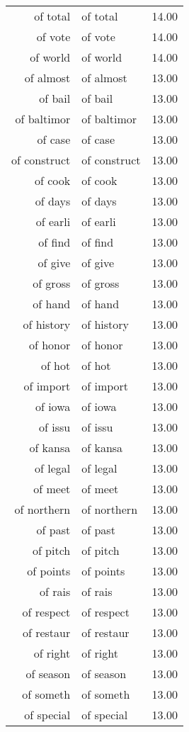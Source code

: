 \begin{table}[ht]
\begin{tabular}{rlr}
  of total & of total & 14.00 \\ 
  of vote & of vote & 14.00 \\ 
  of world & of world & 14.00 \\ 
  of almost & of almost & 13.00 \\ 
  of bail & of bail & 13.00 \\ 
  of baltimor & of baltimor & 13.00 \\ 
  of case & of case & 13.00 \\ 
  of construct & of construct & 13.00 \\ 
  of cook & of cook & 13.00 \\ 
  of days & of days & 13.00 \\ 
  of earli & of earli & 13.00 \\ 
  of find & of find & 13.00 \\ 
  of give & of give & 13.00 \\ 
  of gross & of gross & 13.00 \\ 
  of hand & of hand & 13.00 \\ 
  of history & of history & 13.00 \\ 
  of honor & of honor & 13.00 \\ 
  of hot & of hot & 13.00 \\ 
  of import & of import & 13.00 \\ 
  of iowa & of iowa & 13.00 \\ 
  of issu & of issu & 13.00 \\ 
  of kansa & of kansa & 13.00 \\ 
  of legal & of legal & 13.00 \\ 
  of meet & of meet & 13.00 \\ 
  of northern & of northern & 13.00 \\ 
  of past & of past & 13.00 \\ 
  of pitch & of pitch & 13.00 \\ 
  of points & of points & 13.00 \\ 
  of rais & of rais & 13.00 \\ 
  of respect & of respect & 13.00 \\ 
  of restaur & of restaur & 13.00 \\ 
  of right & of right & 13.00 \\ 
  of season & of season & 13.00 \\ 
  of someth & of someth & 13.00 \\ 
  of special & of special & 13.00 \\ 

\end{tabular}
\end{table}
